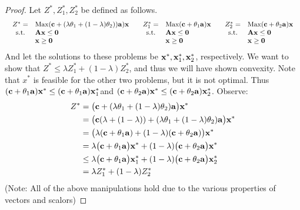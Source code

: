 \begin{proof}
Let $Z^*, Z^*_1, Z^*_2$ be defined as follows.
\begin{equation*}
\begin{array}{lll}
\begin{array}{rl}
Z^* =& \text{Max} ({\bf{c}} + (\lambda \theta_1 + (1-\lambda)\theta_2)){\bf{a}} ) {\bf{x}}\\
\text{s.t.  }&{\bf{A}}{\bf{x}} \leq {\bf{0}}\\
&{\bf{x}} \geq {\bf{0}}
\end{array}
&
\begin{array}{rl}
Z^*_1 =& \text{Max} ({\bf{c}} + \theta_1 {\bf{a}}) {\bf{x}}\\
\text{s.t.  }&{\bf{A}}{\bf{x}} \leq {\bf{0}}\\
&{\bf{x}} \geq {\bf{0}}
\end{array}
&
\begin{array}{rl}
Z^*_2 =& \text{Max} ({\bf{c}} + \theta_2 {\bf{a}}) {\bf{x}}\\
\text{s.t.  }&{\bf{A}}{\bf{x}} \leq {\bf{0}}\\
&{\bf{x}} \geq {\bf{0}}
\end{array}
\end{array}
\end{equation*}
And let the solutions to these problems be ${\bf{x}}^*, {\bf{x}}_1^*, {\bf{x}}_2^*$, respectively.  We want to show that $Z^* \leq \lambda Z_1^* + (1-\lambda)Z_2^*$, and thus we will have shown convexity.  Note that $x^*$ is feasible for the other two problems, but it is not optimal.  Thus $({\bf{c}} + \theta_1 {\bf{a}}){\bf{x}}^*\leq ({\bf{c}} + \theta_1 {\bf{a}}){\bf{x}}_1^*$and $ ({\bf{c}} +\theta_2 {\bf{a}}){\bf{x}}^* \leq ({\bf{c}} +\theta_2 {\bf{a}}){\bf{x}}_2^*$.  Observe:
\begin{align*}
Z^* &= \big({\bf{c}} + (\lambda \theta_1 + (1-\lambda)\theta_2){\bf{a}} \big){\bf{x}}^*\\
	&= \big({\bf{c}}(\lambda + (1-\lambda)) + (\lambda \theta_1 + (1-\lambda)\theta_2){\bf{a}} \big){\bf{x}}^*\\
	&= \big(\lambda({\bf{c}} + \theta_1 {\bf{a}}) + (1-\lambda)({\bf{c}} +\theta_2 {\bf{a}})\big){\bf{x}}^*\\
	&= \lambda\big({\bf{c}} + \theta_1 {\bf{a}}\big){\bf{x}}^* + (1-\lambda)\big({\bf{c}} +\theta_2 {\bf{a}}\big){\bf{x}}^*\\
	&\leq \lambda\big({\bf{c}} + \theta_1 {\bf{a}}\big){\bf{x}}_1^* + (1-\lambda)\big({\bf{c}} +\theta_2 {\bf{a}}\big){\bf{x}}_2^*\\
	&= \lambda Z_1^* + (1-\lambda)Z_2^*
\end{align*}
{\footnotesize{(Note: All of the above manipulations hold due to the various properties of vectors and scalors)}}
\end{proof}

